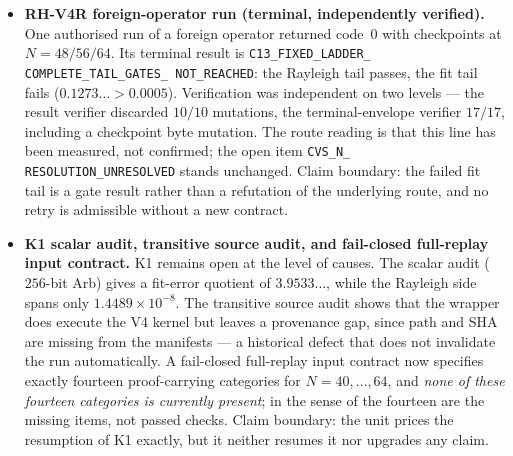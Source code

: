 \documentclass[12pt,a4paper]{article}
\theoremstyle{definition}
\theoremstyle{remark}
\begin{document}
\begin{itemize}
  \item \textbf{RH-V4R foreign-operator run (terminal, independently
    verified).} One authorised run of a foreign operator returned code~$0$
    with checkpoints at $N = 48/56/64$. Its terminal result is
    \texttt{C13\_\allowbreak FIXED\_\allowbreak LADDER\_\allowbreak
    COMPLETE\_\allowbreak TAIL\_\allowbreak GATES\_\allowbreak
    NOT\_\allowbreak REACHED}: the Rayleigh tail passes, the fit tail fails
    ($0.1273\ldots > 0.0005$). Verification was independent on two levels
    --- the result verifier discarded $10/10$ mutations, the
    terminal-envelope verifier $17/17$, including a checkpoint byte
    mutation. The route reading is that this line has been measured, not
    confirmed; the open item \texttt{CVS\_\allowbreak N\_\allowbreak
    RESOLUTION\_\allowbreak UNRESOLVED} stands unchanged. Claim boundary:
    the failed fit tail is a gate result rather than a refutation of the
    underlying route, and no retry is admissible without a new contract.

  \item \textbf{K1 scalar audit, transitive source audit, and fail-closed
    full-replay input contract.} K1 remains open at the level of causes.
    The scalar audit ($256$-bit Arb) gives a fit-error quotient of
    $3.9533\ldots$, while the Rayleigh side spans only
    $1.4489\times 10^{-8}$. The transitive source audit shows that the
    wrapper does execute the V4 kernel but leaves a provenance gap, since
    path and SHA are missing from the manifests --- a historical defect
    that does not invalidate the run automatically. A fail-closed
    full-replay input contract now specifies exactly fourteen
    proof-carrying categories for $N = 40,\dots,64$, and \emph{none of
    these fourteen categories is currently present}; in the sense of
     the fourteen are the missing items, not passed
    checks. Claim boundary: the unit prices the resumption of K1 exactly,
    but it neither resumes it nor upgrades any claim.


\end{itemize}
\end{document}
